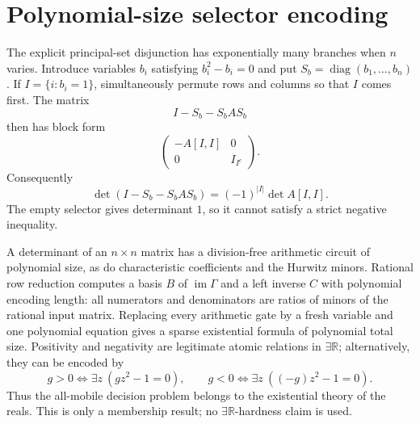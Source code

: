\section{Polynomial-size selector encoding}
\label{sec:selector-independent}

The explicit principal-set disjunction has exponentially many branches when
$n$ varies.  Introduce variables $b_i$ satisfying
$b_i^2-b_i=0$ and put $S_b=\operatorname{diag}(b_1,\ldots,b_n)$.  If
$I=\{i:b_i=1\}$, simultaneously permute rows and columns so that $I$ comes
first.  The matrix
\[
 I-S_b-S_bAS_b
\]
then has block form
\[
 \begin{pmatrix}-A[I,I]&0\\0&I_{I^c}\end{pmatrix}.
\]
Consequently
\begin{equation}
 \det(I-S_b-S_bAS_b)=(-1)^{|I|}\det A[I,I].
 \label{eq:selector-independent}
\end{equation}
The empty selector gives determinant $1$, so it cannot satisfy a strict
negative inequality.

A determinant of an $n\times n$ matrix has a division-free arithmetic circuit
of polynomial size, as do characteristic coefficients and the Hurwitz
minors.  Rational row reduction computes a basis $B$ of
$\operatorname{im}\Gamma$ and a left inverse $C$ with polynomial encoding
length: all numerators and denominators are ratios of minors of the rational
input matrix.  Replacing every arithmetic gate by a fresh variable and one
polynomial equation gives a sparse existential formula of polynomial total
size.  Positivity and negativity are legitimate atomic relations in
$\exists\mathbb R$; alternatively, they can be encoded by
\[
 g>0\iff\exists z\ (gz^2-1=0),\qquad
 g<0\iff\exists z\ ((-g)z^2-1=0).
\]
Thus the all-mobile decision problem belongs to the existential theory of the
reals.  This is only a membership result; no $\exists\mathbb R$-hardness claim
is used.
